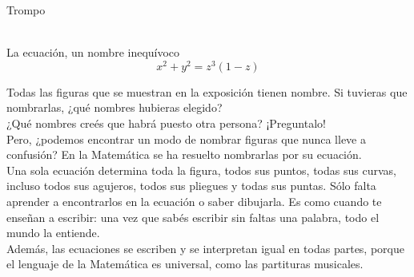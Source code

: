 \documentclass[es]{SurferDesc}%
\begin{document}
\footnotesize

 

\begin{surferPage}
  \begin{surferTitle}Trompo\end{surferTitle}  \\
La ecuaci\'on, un nombre inequ\'ivoco\\
\smallskip
\[x^2 + y^2	= z^3	(1 - z) \]

\vspace{0.3cm}
Todas las figuras que se muestran en la exposici\'on tienen nombre. Si tuvieras que nombrarlas, ¿qu\'e nombres hubieras elegido?\\
\vspace{0.3cm}
¿Qu\'e nombres cre\'es que habr\'a puesto otra persona? ¡Preguntalo!\\
\vspace{0.3cm}
Pero, ¿podemos encontrar un modo de nombrar figuras que nunca lleve a confusi\'on? En la Matem\'atica se ha resuelto nombrarlas por su ecuaci\'on.\\
\vspace{0.3cm}
Una sola ecuaci\'on determina toda la figura, todos sus puntos, todas sus curvas, incluso todos sus agujeros, todos sus pliegues y todas sus puntas. S\'olo falta aprender a encontrarlos en la ecuaci\'on o saber dibujarla. Es como cuando te enseñan a escribir: una vez que sab\'es escribir sin faltas una palabra, todo el mundo la entiende.\\
\vspace{0.3cm}
Adem\'as, las ecuaciones se escriben y se interpretan igual en todas partes, porque el lenguaje de la Matem\'atica es universal, como las partituras musicales.

  \begin{surferText}
     \end{surferText}
\end{surferPage}
\end{document}
